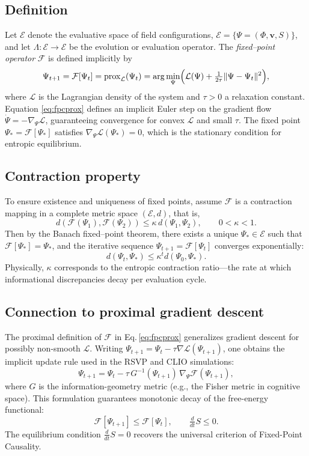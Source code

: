 \documentclass[12pt,a4paper]{article}
\newcommand{\ddt}{\tfrac{d}{dt}}      %
\theoremstyle{plain}
\begin{document}
\subsection{Definition}
Let \(\mathcal{E}\) denote the evaluative space of field configurations,
\(\mathcal{E}=\{\Psi=(\Phi,\mathbf{v},S)\}\),
and let 
\(\Lambda:\mathcal{E}\to\mathcal{E}\)
be the evolution or evaluation operator.
The \emph{fixed--point operator} \(\mathcal{F}\) is defined implicitly by
\begin{equation}
\label{eq:fpcprox}
\Psi_{t+1}=\mathcal{F}[\Psi_t]
   =\operatorname{prox}_{\mathcal{L}}(\Psi_t)
   =\arg\min_{\Psi}\Bigl(
        \mathcal{L}(\Psi)
        +\tfrac{1}{2\tau}\|\Psi-\Psi_t\|^2
      \Bigr),
\end{equation}
where \(\mathcal{L}\) is the Lagrangian density of the system and \(\tau>0\) a relaxation constant.
Equation \eqref{eq:fpcprox} defines an implicit Euler step on the gradient flow
\(\dot{\Psi}=-\nabla_\Psi\mathcal{L}\),
guaranteeing convergence for convex \(\mathcal{L}\) and small \(\tau\).
The fixed point \(\Psi_*=\mathcal{F}[\Psi_*]\)
satisfies \(\nabla_\Psi\mathcal{L}(\Psi_*)=0\),
which is the stationary condition for entropic equilibrium.

\subsection{Contraction property}
To ensure existence and uniqueness of fixed points, 
assume \(\mathcal{F}\) is a contraction mapping in a complete metric space \((\mathcal{E},d)\),
that is,
\begin{equation}
d(\mathcal{F}(\Psi_1),\mathcal{F}(\Psi_2))
   \le \kappa\, d(\Psi_1,\Psi_2),
   \qquad 0<\kappa<1.
\end{equation}
Then by the Banach fixed--point theorem,
there exists a unique \(\Psi_*\in\mathcal{E}\)
such that \(\mathcal{F}[\Psi_*]=\Psi_*\),
and the iterative sequence
\(\Psi_{t+1}=\mathcal{F}[\Psi_t]\)
converges exponentially:
\[
d(\Psi_t,\Psi_*) \le \kappa^t d(\Psi_0,\Psi_*).
\]
Physically, \(\kappa\) corresponds to the entropic contraction ratio—the rate at which informational discrepancies decay per evaluation cycle.

\subsection{Connection to proximal gradient descent}
The proximal definition of \(\mathcal{F}\) in Eq.\,\eqref{eq:fpcprox} generalizes gradient descent for possibly non-smooth \(\mathcal{L}\).
Writing \(\Psi_{t+1}=\Psi_t-\tau\nabla\mathcal{L}(\Psi_{t+1})\),
one obtains the implicit update rule used in the RSVP and CLIO simulations:
\begin{equation}
\Psi_{t+1}=\Psi_t-\tau\,G^{-1}(\Psi_{t+1})\,\nabla_\Psi\mathcal{F}(\Psi_{t+1}),
\end{equation}
where \(G\) is the information-geometry metric (e.g., the Fisher metric in cognitive space).
This formulation guarantees monotonic decay of the free-energy functional:
\[
\mathcal{F}[\Psi_{t+1}]\le \mathcal{F}[\Psi_t],
\qquad
\ddt S\le0.
\]
The equilibrium condition \(\ddt S=0\) recovers the universal criterion of Fixed-Point Causality.
\end{document}
